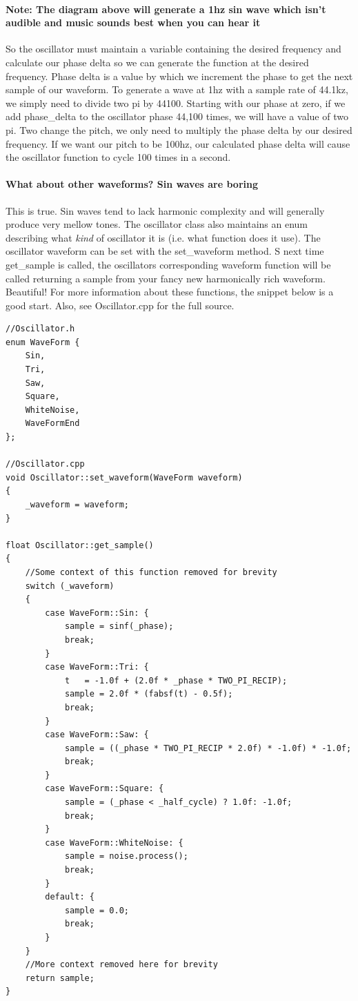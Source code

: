 \documentclass[acmlarge,screen]{acmart}
\begin{document}
	\paragraph{Note: The diagram above will generate a 1hz sin wave which isn't audible and music sounds best when you can hear it} So the oscillator must maintain a variable containing the desired frequency and calculate our phase delta so we can generate the function at the desired frequency. Phase delta is a value by which we increment the phase to get the next sample of our waveform. To generate a wave at 1hz with a sample rate of 44.1kz, we simply need to divide two pi by 44100. Starting with our phase at zero, if we add phase\_delta to the oscillator phase 44,100 times, we will have a value of two pi. Two change the pitch, we only need to multiply the phase delta by our desired frequency. If we want our pitch to be 100hz, our calculated phase delta will cause the oscillator function to cycle 100 times in a second.

	\paragraph{What about other waveforms? Sin waves are boring} This is true. Sin waves tend to lack harmonic complexity and will generally produce very mellow tones. The oscillator class also maintains an enum describing what \textit{kind} of oscillator it is (i.e. what function does it use). The oscillator waveform can be set with the set\_waveform method. S next time get\_sample is called, the oscillators corresponding waveform function will be called returning a sample from your fancy new harmonically rich waveform. Beautiful! For more information about these functions, the snippet below is a good start. Also, see Oscillator.cpp for the full source.

\begin{verbatim}
//Oscillator.h
enum WaveForm {
	Sin,
	Tri,
	Saw,
	Square,
	WhiteNoise,
	WaveFormEnd
};

//Oscillator.cpp
void Oscillator::set_waveform(WaveForm waveform)
{
	_waveform = waveform;
}

float Oscillator::get_sample()
{
	//Some context of this function removed for brevity
	switch (_waveform)
	{
		case WaveForm::Sin: {
			sample = sinf(_phase);
			break;
		}
		case WaveForm::Tri: {
			t   = -1.0f + (2.0f * _phase * TWO_PI_RECIP);
			sample = 2.0f * (fabsf(t) - 0.5f);
			break;
		}
		case WaveForm::Saw: {
			sample = ((_phase * TWO_PI_RECIP * 2.0f) * -1.0f) * -1.0f;
			break;
		}
		case WaveForm::Square: {
			sample = (_phase < _half_cycle) ? 1.0f: -1.0f;
			break;
		}
		case WaveForm::WhiteNoise: {
			sample = noise.process();
			break;
		}
		default: {
			sample = 0.0;
			break;
		}
	}
	//More context removed here for brevity
	return sample;
}
\end{verbatim}
\end{document}
